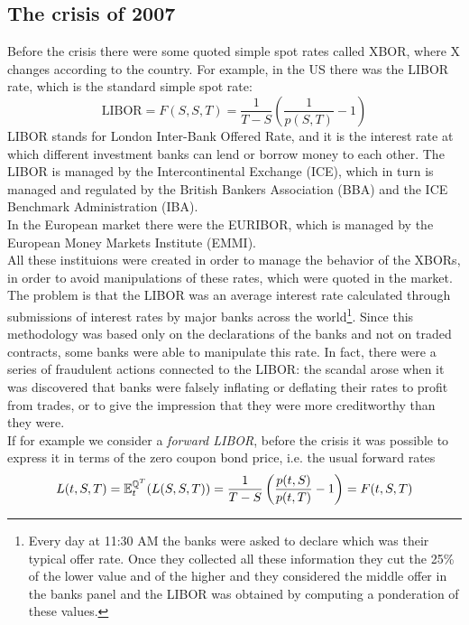 \subsection{The crisis of 2007} %
Before the crisis there were some quoted simple spot rates called XBOR, where X changes according to the country. For example, in the US there was the LIBOR rate, which is the standard simple spot rate:
\begin{equation}
    \text{LIBOR} = F(S,S,T) = \frac{1}{T-S}\left(\frac{1}{p(S,T)}-1\right)
\end{equation}
LIBOR stands for London Inter-Bank Offered Rate, and it is the interest rate at which different investment banks can lend or borrow money to each other. The LIBOR is managed by the Intercontinental Exchange (ICE), which in turn is managed and regulated by the British Bankers Association (BBA) and the ICE Benchmark Administration (IBA).\\
In the European market there were the EURIBOR, which is managed by the European Money Markets Institute (EMMI).\\
All these instituions were created in order to manage the behavior of the XBORs, in order to avoid manipulations of these rates, which were quoted in the market. The problem is that the LIBOR was an average interest rate calculated through submissions of interest rates by major banks across the world\footnote{Every day at 11:30 AM the banks were asked to declare which was their typical offer rate. Once they collected all these information they cut the 25\% of the lower value and of the higher and they considered the middle offer in the banks panel and the LIBOR was obtained by computing a ponderation of these values.}. Since this methodology was based only on the declarations of the banks and not on traded contracts, some banks were able to manipulate this rate. In fact, there were a series of fraudulent actions connected to the LIBOR: the scandal arose when it was discovered that banks were falsely inflating or deflating their rates to profit from trades, or to give the impression that they were more creditworthy than they were. \\
If for example we consider a \emph{forward LIBOR}, before the crisis it was possible to express it in terms of the zero coupon bond price, i.e. the usual forward rates
\begin{equation*}
    L(t,S,T) = \mathbb{E}^{\mathbb{Q}^T}_t(L(S,S,T)) = \frac{1}{T-S}\left(\frac{p(t,S)}{p(t,T)}-1\right) = F(t,S,T)
\end{equation*}
